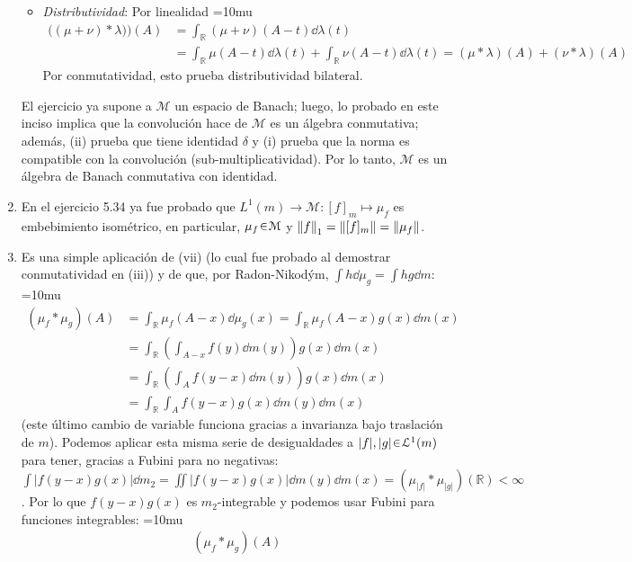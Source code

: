 \begin{sol}
\begin{enumerate}[label=(\roman*)]
\begin{itemize}
\item\emph{Distributividad}: Por linealidad
{\thickmuskip=10mu
\begin{align*}
\bigl((\mu+\nu)*\lambda)\bigr)(A) 
&= \int_{\mathbb{R}} (\mu+\nu)(A-t) \dd{\lambda(t)}\\
&=\int_{\mathbb{R}} \mu(A-t) \dd{\lambda(t)} + \int_{\mathbb{R}} \nu(A-t) \dd{\lambda(t)}
= (\mu*\lambda)(A) + (\nu*\lambda)(A)
\end{align*}}%
Por conmutatividad, esto prueba distributividad bilateral.
\end{itemize}
El ejercicio ya supone a $\mathcal{M}$ un espacio de Banach; luego, lo probado en este inciso implica que la convolución hace de $\mathcal{M}$ es un álgebra conmutativa; además, (ii) prueba que tiene identidad $\delta$ y (i) prueba que la norma es compatible con la convolución (sub-multiplicatividad). Por lo tanto, $\mathcal{M}$ es un álgebra de Banach conmutativa con identidad.
\item %
En el ejercicio 5.34 ya fue probado que $L^1(m) \to \mathcal{M}\colon[f]_m \mapsto \mu_f$ es embebimiento isométrico, en particular, $\mu_f\en\mathcal{M}$ y $\norm{f}_1 = \norm{[f]_m} = \norm{\mu_f}$. 
\item %
Es una simple aplicación de (vii) (lo cual fue probado al demostrar conmutatividad en (iii)) y de que, por Radon-Nikodým, $\int h \dd{\mu_g} = \int hg\dd{m}$:
{\thickmuskip=10mu
\begin{align*}
(\mu_f*\mu_g)(A)
&=\int_{\mathbb{R}} \mu_f(A-x) \dd{\mu_g(x)}
=\int_{\mathbb{R}} \mu_f(A-x)g(x) \dd{m(x)}\\
&=\int_{\mathbb{R}} \left(\int_{A-x} f(y)\dd{m(y)}\right)g(x) \dd{m(x)}\\
&=\int_{\mathbb{R}} \left(\int_{A} f(y-x)\dd{m(y)}\right)g(x) \dd{m(x)}\\
&=\int_{\mathbb{R}} \int_{A} f(y-x)g(x)\dd{m(y)} \dd{m(x)}
\end{align*}}%
(este último cambio de variable funciona gracias a invarianza bajo traslación de $m$). Podemos aplicar esta misma serie de desigualdades a $|f|,|g|\en\mathcal{L}^1(m)$ para tener, gracias a Fubini para no negativas: $\int |f(y-x)g(x)| \dd{m_2} = \iint |f(y-x)g(x)|\dd{m(y)} \dd{m(x)} = (\mu_{|f|}*\mu_{|g|})(\mathbb{R}) <\infty$. Por lo que $f(y-x)g(x)$ es $m_2$-integrable y podemos usar Fubini para funciones integrables:
{\thickmuskip=10mu
\begin{align*}
(\mu_f*\mu_g)(A)

\end{align*}}
\end{enumerate}
\end{sol}
